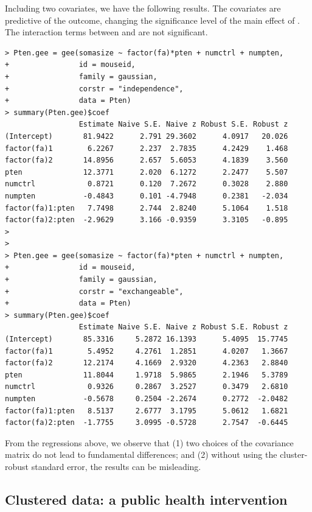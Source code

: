 Including two covariates, we have the following results. The covariates are predictive of the outcome, changing the significance level of the main effect of .  The interaction terms between  and  are not significant. 
\begin{lstlisting}
> Pten.gee = gee(somasize ~ factor(fa)*pten + numctrl + numpten, 
+                id = mouseid, 
+                family = gaussian, 
+                corstr = "independence",
+                data = Pten)
> summary(Pten.gee)$coef 
                 Estimate Naive S.E. Naive z Robust S.E. Robust z
(Intercept)       81.9422      2.791 29.3602      4.0917   20.026
factor(fa)1        6.2267      2.237  2.7835      4.2429    1.468
factor(fa)2       14.8956      2.657  5.6053      4.1839    3.560
pten              12.3771      2.020  6.1272      2.2477    5.507
numctrl            0.8721      0.120  7.2672      0.3028    2.880
numpten           -0.4843      0.101 -4.7948      0.2381   -2.034
factor(fa)1:pten   7.7498      2.744  2.8240      5.1064    1.518
factor(fa)2:pten  -2.9629      3.166 -0.9359      3.3105   -0.895
>  
> 
> Pten.gee = gee(somasize ~ factor(fa)*pten + numctrl + numpten, 
+                id = mouseid, 
+                family = gaussian, 
+                corstr = "exchangeable",
+                data = Pten)
> summary(Pten.gee)$coef
                 Estimate Naive S.E. Naive z Robust S.E. Robust z
(Intercept)       85.3316     5.2872 16.1393      5.4095  15.7745
factor(fa)1        5.4952     4.2761  1.2851      4.0207   1.3667
factor(fa)2       12.2174     4.1669  2.9320      4.2363   2.8840
pten              11.8044     1.9718  5.9865      2.1946   5.3789
numctrl            0.9326     0.2867  3.2527      0.3479   2.6810
numpten           -0.5678     0.2504 -2.2674      0.2772  -2.0482
factor(fa)1:pten   8.5137     2.6777  3.1795      5.0612   1.6821
factor(fa)2:pten  -1.7755     3.0995 -0.5728      2.7547  -0.6445
\end{lstlisting}
 
 
From the regressions above, we observe that (1) two choices of the covariance matrix do not lead to fundamental differences; and (2) without using the cluster-robust standard error, the results can be misleading. 
 
 
 \subsection{Clustered data: a public health intervention} 

